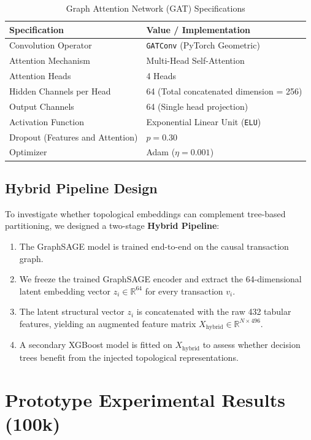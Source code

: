 \documentclass[11pt,a4paper]{report}
\begin{document}
\begin{table}[H]
\centering
\caption{Graph Attention Network (GAT) Specifications}
\label{tab:gat_arch}
\begin{tabular}{ll}
\toprule
\textbf{Specification} & \textbf{Value / Implementation} \\
\midrule
Convolution Operator & \texttt{GATConv} (PyTorch Geometric) \\
Attention Mechanism & Multi-Head Self-Attention \\
Attention Heads & 4 Heads \\
Hidden Channels per Head & 64 (Total concatenated dimension = 256) \\
Output Channels & 64 (Single head projection) \\
Activation Function & Exponential Linear Unit (\texttt{ELU}) \\
Dropout (Features and Attention) & $p = 0.30$ \\
Optimizer & Adam ($\eta = 0.001$) \\
\bottomrule
\end{tabular}
\end{table}

\subsection{Hybrid Pipeline Design}
To investigate whether topological embeddings can complement tree-based partitioning, we designed a two-stage \textbf{Hybrid Pipeline}:
\begin{enumerate}
    \item The GraphSAGE model is trained end-to-end on the causal transaction graph.
    \item We freeze the trained GraphSAGE encoder and extract the 64-dimensional latent embedding vector $z_i \in \mathbb{R}^{64}$ for every transaction $v_i$.
    \item The latent structural vector $z_i$ is concatenated with the raw 432 tabular features, yielding an augmented feature matrix $X_{\text{hybrid}} \in \mathbb{R}^{N \times 496}$.
    \item A secondary XGBoost model is fitted on $X_{\text{hybrid}}$ to assess whether decision trees benefit from the injected topological representations.
\end{enumerate}

\newpage
\section{Prototype Experimental Results (100k)}
\end{document}
